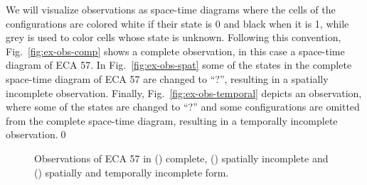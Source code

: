 \begin{example}
	We will visualize observations as space-time diagrams where the cells of the configurations are colored white if their state is 0 and black when it is 1, while grey is used to color cells whose state is unknown. Following this convention, Fig.~\ref{fig:ex-obs-comp} shows a complete observation, in this case a space-time diagram of ECA 57. In Fig.~\ref{fig:ex-obs-spat} some of the states in the complete space-time diagram of ECA 57 are changed to ``?'', resulting in a spatially incomplete observation. Finally, Fig.~\ref{fig:ex-obs-temporal} depicts an observation, where some of the states are changed to ``?'' and some configurations are omitted from the complete space-time diagram, resulting in a temporally incomplete observation.\qed%
	\begin{figure}
		\centering
		\quad
		\quad
		\caption{Observations of ECA 57 in (\protect{}) complete, (\protect{}) spatially incomplete and (\protect{}) spatially and temporally incomplete form.}\label{fig:ex-obs}
	\end{figure}
\end{example}

